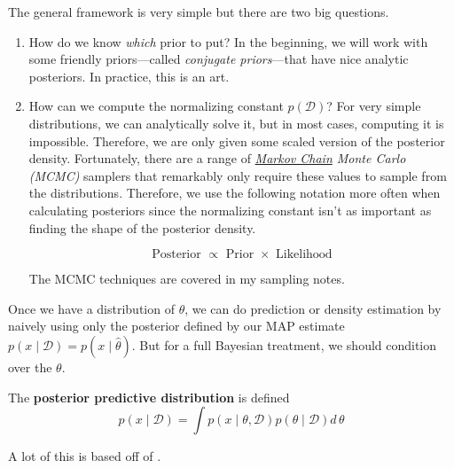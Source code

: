 The general framework is very simple but there are two big questions. 
\begin{enumerate}
  \item How do we know \textit{which} prior to put? In the beginning, we will work with some friendly priors---called \textit{conjugate priors}---that have nice analytic posteriors. In practice, this is an art. 

  \item How can we compute the normalizing constant $p(\mathcal{D})$? For very simple distributions, we can analytically solve it, but in most cases, computing it is impossible. Therefore, we are only given some scaled version of the posterior density. Fortunately, there are a range of \textit{\hyperref[sp-def:markov-chain]{Markov Chain} Monte Carlo (MCMC)} samplers that remarkably only require these values to sample from the distributions. Therefore, we use the following notation more often when calculating posteriors since the normalizing constant isn't as important as finding the shape of the posterior density.

  \begin{equation}
    \text{Posterior } \propto \text{ Prior } \times \text{ Likelihood}
  \end{equation}

  The MCMC techniques are covered in my sampling notes. 
\end{enumerate}

Once we have a distribution of $\theta$, we can do prediction or density estimation by naively using only the posterior defined by our MAP estimate $p(x \mid \mathcal{D}) = p(x \mid \hat{\theta})$. But for a full Bayesian treatment, we should condition over the $\theta$. 

\begin{definition}
  \label{def:posterior-predictive-distribution}
  The \textbf{posterior predictive distribution} is defined 
  \begin{equation}
    p(x \mid \mathcal{D}) = \int p(x \mid \theta, \mathcal{D}) p(\theta \mid \mathcal{D}) d\, \theta
  \end{equation}
\end{definition}

A lot of this is based off of \cite{2009hoff}. 

